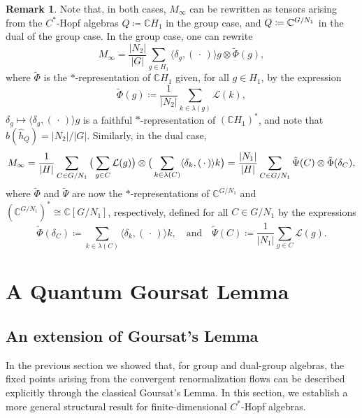 \documentclass[a4paper,10pt]{amsart}
\newcommand{\eval}[2]{\langle #1 , #2\rangle}
\newcommand{\placeholder}{\,\cdot\,}
\theoremstyle{definition}
\newtheorem{remark}[theorem]{Remark}
\begin{document}

\begin{remark}\label{rem:RewriteMinftyGroup}
    Note that, in both cases, $M_{\infty}$ can be rewritten as tensors arising from the $C^*$-Hopf algebras $Q\coloneqq \mathbb{C}H_1$ in the group case, and $Q \coloneqq \mathbb{C}^{\smash{G/N_1}}$ in the dual of the group case. In the group case, one can rewrite
    \[
        M_{\infty} = \frac{|N_2|}{|G|} \sum_{g\in H_1} \eval{\delta_g}{(\placeholder)} g \otimes \tilde\Phi(g),
	\]
    where $\tilde\Phi$ is the $*$-representation of $\mathbb{C}H_1$ given, for all $g\in H_1$, by the expression
    \[
        \tilde\Phi(g)
            \coloneqq
                \frac{1}{|N_2|} \sum_{k\in \lambda(g)} \mathcal{L}(k),
    \]
    $\delta_g\mapsto \eval{\delta_g}{(\placeholder)} g$ is a faithful $*$-representation of $(\mathbb{C}H_1)^*$, and note that $\hat{b}(\hat{h}_{Q}) = |N_2|/|G|$.
    Similarly, in the dual case,
    \[
        M_{\infty}
        =
            \frac{1}{|H|} \sum_{C \in G/N_1} \big( \sum_{g \in C} \mathcal{L}(g) \big)
                \otimes  \big( \sum_{\smash{k\in \lambda(C)}} \eval{\delta_k}{(\placeholder)} k \big)
        =
            \frac{|N_1|}{|H|} \sum_{C \in G/N_1} \tilde{\Psi}(C) \otimes  \tilde\Phi(\delta_C),
    \]
    where $\tilde\Phi$ and $\tilde\Psi$ are now the $*$-representations of $\mathbb{C}^{G/N_1}$ and $(\mathbb{C}^{G/N_1})^*\cong \mathbb{C}[G/N_1]$, respectively, defined for all $C\in G/N_1$ by the expressions
    \[
        \tilde\Phi(\delta_C)
            \coloneqq
                \sum_{k\in \lambda(C)} \eval{\delta_k}{(\placeholder)} k
        ,\quad\text{and}\quad
        \tilde\Psi(C)
            \coloneqq
                \frac{1}{|N_1|} \sum_{g\in C} \mathcal{L}(g).
    \]
\end{remark}

\section{A Quantum Goursat Lemma}
\label{sec:quantumgoursat}

\subsection{An extension of Goursat's Lemma}
In the previous section we showed that, for group and dual-group algebras, the fixed points arising from the convergent renormalization flows can be described explicitly through the classical Goursat's Lemma. In this section, we establish a more general structural result for finite-dimensional $C^*$-Hopf algebras.
\end{document}
